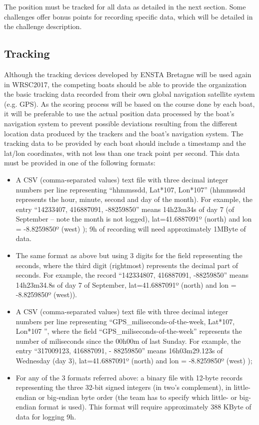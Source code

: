 \documentclass[12pt]{article}
\begin{document}
The position must be tracked for all data as detailed in the next section.
Some challenges offer bonus points for recording specific data, which will be
detailed in the challenge description.

\subsection{Tracking}
Although the tracking devices developed by ENSTA Bretagne will be used again in
WRSC2017, the competing boats should be able to provide the organization the basic
tracking data recorded from their own global navigation satellite system (e.g. GPS). As the scoring
process will be based on the course done by each boat, it will be preferable to use the actual
position data processed by the boat’s navigation system to prevent possible deviations
resulting from the different location data produced by the trackers and the boat’s navigation
system.
The tracking data to be provided by each boat should include a timestamp and the
lat/lon coordinates, with not less than one track point per second. This data must be
provided in one of the following formats:
\begin{itemize}
  \item A CSV (comma-separated values) text file with three decimal integer numbers
per line representing “hhmmssdd, Lat*107, Lon*107” (hhmmssdd represents the hour,
minute, second and day of the month). For example, the entry “14233407,
416887091, -88259850” means 14h23m34s of day 7 (of September – note the month
is not logged), lat=41.6887091º (north) and lon = -8.8259850º (west) ); 9h of
recording will need approximately 1MByte of data.
  \item The same format as above but using 3 digits for the field representing the
seconds, where the third digit (rightmost) represents the decimal part of seconds. For
example, the record “142334807, 416887091, -88259850” means 14h23m34.8s of day 7
of September, lat=41.6887091º (north) and lon = -8.8259850º (west)).
 \item A CSV (comma-separated values) text file with three decimal integer numbers
per line representing “GPS\_miliseconds-of-the-week, Lat*107, Lon*107
”, where the field “GPS\_miliseconds-of-the-week” represents the number of miliseconds since
the 00h00m of last Sunday. For example, the entry “317009123, 416887091, -
88259850” means 16h03m29.123s of Wednesday (day 3), lat=41.6887091º (north) and
lon = -8.8259850º (west) );
 \item For any of the 3 formats referred above: a binary file with 12-byte records
representing the three 32-bit signed integers (in two’s complement), in little-endian or
big-endian byte order (the team has to specify which little- or big-endian format is used).
This format will require approximately 388 KByte of data for logging 9h.
\end{itemize}
\end{document}
